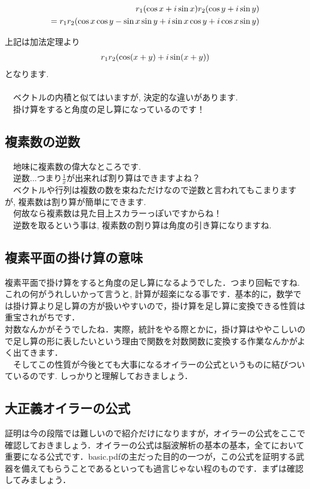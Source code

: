 \documentclass[11pt,a4paper]{ujreport}
\begin{document}
\begin{align}
\mathstrut r_1(\cos x + \mathstrut i\sin x)\mathstrut r_2(\cos y + \mathstrut i\sin y)\\
= \mathstrut r_1\mathstrut r_2(\cos x\cos y - \sin x\sin y + \mathstrut i\sin x \cos y + \mathstrut i\cos x\sin y)
\end{align}

上記は加法定理より
\begin{eqnarray}
\mathstrut r_1\mathstrut r_2(\cos (\mathstrut x + \mathstrut y) + \mathstrut i\sin (\mathstrut x + \mathstrut y))
\end{eqnarray}
となります.\\
\\
　ベクトルの内積と似てはいますが, 決定的な違いがあります.\\
　掛け算をすると角度の足し算になっているのです！\\

\subsection{複素数の逆数}
　地味に複素数の偉大なところです.\\
　逆数...つまり$\frac{1}{x}$が出来れば割り算はできますよね？\\
　ベクトルや行列は複数の数を束ねただけなので逆数と言われてもこまりますが, 複素数は割り算が簡単にできます. \\
　何故なら複素数は見た目上スカラーっぽいですからね！\\
　逆数を取るという事は, 複素数の割り算は角度の引き算になりますね.\\

\subsection{複素平面の掛け算の意味}
複素平面で掛け算をすると角度の足し算になるようでした．つまり回転ですね. これの何がうれしいかって言うと, 計算が超楽になる事です．基本的に，数学では掛け算より足し算の方が扱いやすいので，掛け算を足し算に変換できる性質は重宝されがちです．\\

対数なんかがそうでしたね．実際，統計をやる際とかに，掛け算はややこしいので足し算の形に表したいという理由で関数を対数関数に変換する作業なんかがよく出てきます．
\\
　そしてこの性質が今後とても大事になるオイラーの公式というものに結びついているのです. しっかりと理解しておきましょう．
\subsection{大正義オイラーの公式}
証明は今の段階では難しいので紹介だけになりますが，オイラーの公式をここで確認しておきましょう．オイラーの公式は脳波解析の基本の基本，全てにおいて重要になる公式です．basic.pdfの主だった目的の一つが，この公式を証明する武器を備えてもらうことであるといっても過言じゃない程のものです．まずは確認してみましょう．
\end{document}
